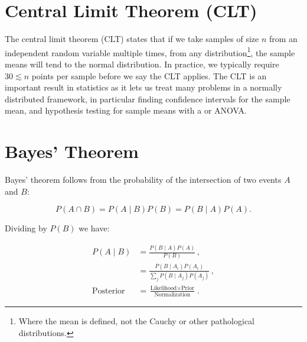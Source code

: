 \section{Central Limit Theorem (CLT)}
\label{stats:CLT}

The central limit theorem (CLT) states that
if we take samples of size $n$ from an independent random variable multiple times,
from any distribution\footnote{Where the mean is defined, \ie not the Cauchy or other pathological distributions.},
the sample means will tend to the normal distribution.
In practice, we typically require $\num{30} \lesssim n$ points per sample before we say the CLT applies.
The CLT is an important result in statistics as it lets us
treat many problems in a normally distributed framework,
in particular finding confidence intervals for the sample mean,
and hypothesis testing for sample means with a \ttest or ANOVA.

\section{Bayes' Theorem}
\label{stats:Bayes_rule}

Bayes' theorem follows from the probability of the intersection of two events $A$ and $B$:

\begin{equation}\label{eq:stats:intersection}
P\left(A \cap B\right) = P\left(A \mid B\right) P\left(B\right) = P\left(B \mid A\right) P\left(A\right).
\end{equation}

\noindent Dividing by $P\left(B\right)$ we have:

\begin{equation}\label{eq:stats:Bayes_rule}
\begin{split}
P\left(A \mid B\right) &= \frac{P\left(B \mid A\right) P\left(A\right)}{P\left(B\right)}\,, \\
&= \frac{P\left(B \mid A_{i}\right) P\left(A_{i}\right)}{\sum_{j} P\left(B \mid A_{j}\right)P\left(A_{j}\right)}\,, \\
\text{Posterior} &= \frac{\text{Likelihood} \times \text{Prior}}{\text{Normalization}}\,.
\end{split}
\end{equation}


